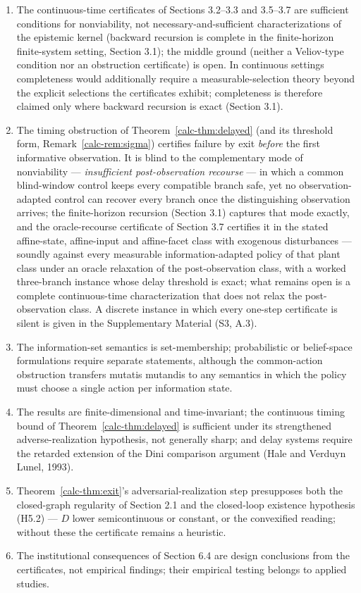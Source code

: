 \documentclass[10pt,twocolumn]{article}
\theoremstyle{definition}
\providecommand{\tightlist}{\setlength{\itemsep}{0pt}\setlength{\parskip}{0pt}}
\begin{document}
\begin{enumerate}
\def\labelenumi{(\roman{enumi})}
\tightlist
\item
  The continuous-time certificates of Sections 3.2--3.3 and 3.5--3.7 are sufficient conditions for nonviability, not necessary-and-sufficient characterizations of the epistemic kernel (backward recursion is complete in the finite-horizon finite-system setting, Section 3.1); the middle ground (neither a Veliov-type condition nor an obstruction certificate) is open. In
continuous settings completeness would additionally require a
measurable-selection theory beyond the explicit selections the
certificates exhibit; completeness is therefore claimed only where
backward recursion is exact (Section 3.1).
\item
  The timing obstruction of Theorem~\ref{calc-thm:delayed} (and its threshold form, Remark~\ref{calc-rem:sigma}) certifies failure by exit \emph{before} the first informative observation. It is blind to the complementary mode of nonviability --- \emph{insufficient post-observation recourse} --- in which a common blind-window control keeps every compatible branch safe, yet no observation-adapted control can recover every branch once the distinguishing observation arrives; the finite-horizon recursion (Section 3.1) captures that mode exactly, and the oracle-recourse certificate of Section 3.7 certifies it in the stated affine-state, affine-input and affine-facet class with exogenous disturbances --- soundly against every measurable information-adapted policy of that plant class under an oracle relaxation of the post-observation class, with a worked three-branch instance whose delay threshold is exact; what remains open is a complete continuous-time characterization that does not relax the post-observation class. A discrete instance in which every one-step certificate is silent is given in the Supplementary Material (S3, A.3).
\item
  The information-set semantics is set-membership; probabilistic or belief-space formulations require separate statements, although the common-action obstruction transfers mutatis mutandis to any semantics in which the policy must choose a single action per information state.
\item
  The results are finite-dimensional and time-invariant; the continuous timing bound of Theorem~\ref{calc-thm:delayed} is sufficient under its strengthened adverse-realization hypothesis, not generally sharp; and delay systems require the retarded extension of the Dini comparison argument (Hale and Verduyn Lunel, 1993).
\item
  Theorem~\ref{calc-thm:exit}'s adversarial-realization step presupposes both the closed-graph regularity of Section 2.1 and the closed-loop existence hypothesis (H5.2) --- \(D\) lower semicontinuous or constant, or the convexified reading; without these the certificate remains a heuristic.
\item
  The institutional consequences of Section 6.4 are design conclusions from the certificates, not empirical findings; their empirical testing belongs to applied studies.
\end{enumerate}
\end{document}
